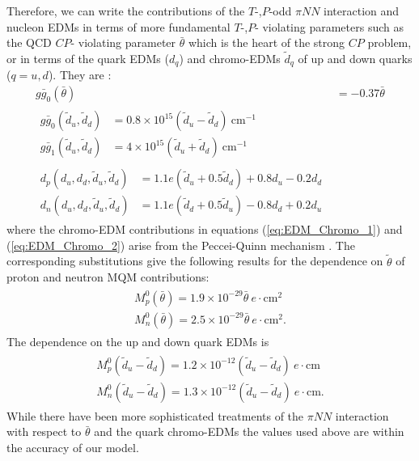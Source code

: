 \documentclass[10pt,a4paper, twoside, openright]{report}
\begin{document}
Therefore, we can write the contributions of the $T$-,$P$-odd $\pi NN$ interaction and nucleon EDMs in terms of more fundamental $T$-,$P$- violating parameters such as the  QCD $CP$- violating parameter $\bar{\theta}$ which is the heart of the strong $CP$ problem,  or in terms of the quark EDMs  ($d_{q}$) and chromo-EDMs $\tilde{d}_{q}$ of up and down quarks ($q=u,d$). They are \cite{ Crewther1979,Pospelov1999, Pospelov2005, Alexandrou2017, JLQCD, PNDME2018}:
\begin{align}
g\bar{g}_0(\bar{\theta})&= -0.37 \bar{\theta} \\
\begin{split}
g\bar{g}_0(\tilde{d}_u, \tilde{d}_d)&= 0.8\times 10^{15} \left(\tilde{d}_u - \tilde{d}_{d}\right) \ \text{cm}^{-1} \\
g\bar{g}_1(\tilde{d}_u, \tilde{d}_d)&= 4\times 10^{15} \left(\tilde{d}_u + \tilde{d}_{d}\right) \ \text{cm}^{-1}
\end{split} \label{eq:EDM_Chromo_1} \\
\begin{split}
d_{p}(d_u, d_d, \tilde{d}_u, \tilde{d}_d) &= 1.1e\left(\tilde{d}_u + 0.5\tilde{d}_{d}\right) + 0.8 d_u - 0.2d_d \\
d_{n}(d_u, d_d, \tilde{d}_u, \tilde{d}_d) &= 1.1e\left(\tilde{d}_d + 0.5\tilde{d}_{u}\right) - 0.8 d_d + 0.2d_u
\end{split} \label{eq:EDM_Chromo_2}
\end{align}
where the chromo-EDM contributions in equations (\ref{eq:EDM_Chromo_1}) and (\ref{eq:EDM_Chromo_2}) arise from the Peccei-Quinn mechanism \cite{Peccei1977, Pospelov2005}. 
The corresponding substitutions give the following results for the dependence on $\tilde{\theta}$ of  proton and neutron MQM contributions:
\begin{align}
\begin{split}
M_{p}^0(\bar{\theta}) = 1.9 \times 10^{-29}\bar{\theta} \ e\cdot\text{cm}^2 \\
M_{n}^0(\bar{\theta}) = 2.5 \times 10^{-29}\bar{\theta} \ e\cdot\text{cm}^2.
\end{split}
\end{align}
The dependence  on the up and down quark EDMs is
\begin{align} 
\begin{split}
M_{p}^0(\tilde{d}_u - \tilde{d}_d) = 1.2 \times 10^{-12}(\tilde{d}_u - \tilde{d}_d) \ e\cdot\text{cm} \\
M_{n}^0(\tilde{d}_u - \tilde{d}_d) = 1.3 \times 10^{-12}(\tilde{d}_u - \tilde{d}_d) \ e\cdot\text{cm}. 
\end{split}
\end{align}
While there have been more sophisticated treatments of the  $\pi NN$ interaction with respect to $\bar{\theta}$\cite{Vries2015, Engel2013, Yamanaka2017, Chupp2019} and the quark chromo-EDMs \cite{Fuyuto2013, Seng2018, Engel2013, Yamanaka2017, Chupp2019} the values used above are within the accuracy of our model.  
\end{document}
